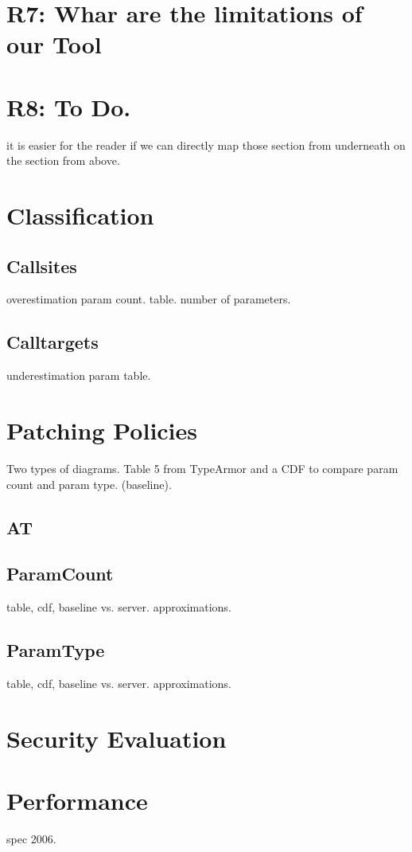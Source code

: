 \section{R7: Whar are the limitations of our Tool}

\section{R8: To Do.}


it is easier for the reader if we can directly map those section from underneath on the section from above.

\section{Classification}
\subsection{Callsites}
overestimation param count. table.
number of parameters.

\subsection{Calltargets}
underestimation param table.

\section{Patching Policies}
Two types of diagrams. Table 5 from TypeArmor and a CDF to compare param count and param type. (baseline).
\subsection{AT}
\subsection{ParamCount}
table, cdf, baseline vs. server. approximations.

\subsection{ParamType}
table, cdf, baseline vs. server. approximations.

\section{Security Evaluation}

\section{Performance}
spec 2006.